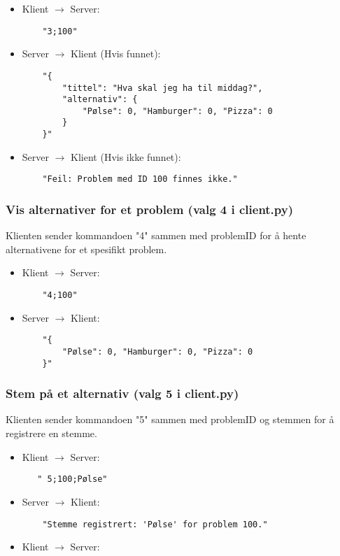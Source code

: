 \documentclass[hidelinks]{article}
\begin{document}
\begin{itemize}
    \item Klient \(\rightarrow\) Server:
    \begin{verbatim}
    "3;100"
    \end{verbatim}
     \item Server \(\rightarrow\) Klient (Hvis funnet):
     \begin{verbatim}
    "{
        "tittel": "Hva skal jeg ha til middag?",
        "alternativ": {
            "Pølse": 0, "Hamburger": 0, "Pizza": 0
        }
    }"
    \end{verbatim}
    \item Server \(\rightarrow\) Klient (Hvis ikke funnet):
    \begin{verbatim}
    "Feil: Problem med ID 100 finnes ikke."
    \end{verbatim}
\end{itemize}

\subsubsection{Vis alternativer for et problem (valg 4 i client.py)}
Klienten sender kommandoen "4" sammen med problemID for å hente alternativene for et spesifikt problem.

\begin{itemize}
    \item Klient \(\rightarrow\) Server:
    \begin{verbatim}
    "4;100"
    \end{verbatim}
    \item Server \(\rightarrow\) Klient:
    \begin{verbatim}
    "{
        "Pølse": 0, "Hamburger": 0, "Pizza": 0
    }"
    \end{verbatim}
\end{itemize}

\subsubsection{Stem på et alternativ (valg 5 i client.py)}
Klienten sender kommandoen "5" sammen med problemID og stemmen for å registrere en stemme.

\begin{itemize}
    \item Klient \(\rightarrow\) Server:
    \begin{verbatim}
   " 5;100;Pølse"
    \end{verbatim}
    \item Server \(\rightarrow\) Klient:
    \begin{verbatim}
    "Stemme registrert: 'Pølse' for problem 100."
    \end{verbatim}
    \item Klient \(\rightarrow\) Server:
\end{itemize}
\end{document}
